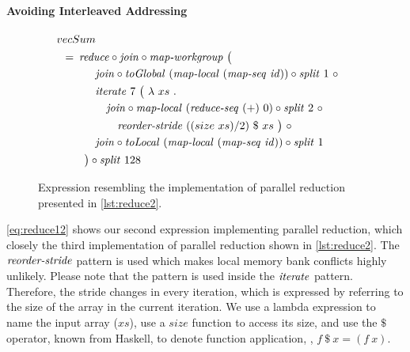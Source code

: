 \paragraph{Avoiding Interleaved Addressing}
\begin{figure}
  \begin{align*}
    &\hspace{-1.5em}vecSum\\
    &\hspace{-2em}\quad\begin{aligned}
      &=\hspace{.2em}
        \reduce \circ \join \circ \mapWorkgroup\ \big(\\
        &\qquad\quad \join \circ \toGlobal\ (\mapLocal\ (\mapSeq\ \id)) \circ \splitN\ 1\ \circ\\
        &\qquad\quad \iterateN\ 7\ \big(\ \lambda\ xs\ .\\
        &\qquad\qquad \join \circ \mapLocal\ (\reduceSeq\ (+)\ 0) \circ \splitN\ 2\ \circ\\
        &\qquad\qquad\quad \reorderStride\ ((size\ xs)/2)\ \$\ xs\ \big)\ \circ\\
        &\qquad\quad \join \circ \toLocal\ (\mapLocal\ (\mapSeq\ \id)) \circ \splitN\ 1\\
        &\qquad\big) \circ \splitN\ 128
    \end{aligned}
  \end{align*}
  \caption{Expression resembling the implementation of parallel reduction presented in \autoref{lst:reduce2}.}
  \label{eq:reduce12}
\end{figure}
%
\autoref{eq:reduce12} shows our second expression implementing parallel reduction, which closely  the third implementation of parallel reduction shown in \autoref{lst:reduce2}.
The $\text{\textit{reorder-stride}}$ pattern is used which makes local memory bank conflicts highly unlikely.
Please note that the pattern is used inside the $\text{\textit{iterate}}$ pattern.
Therefore, the stride changes in every iteration, which is expressed by referring to the size of the array in the current iteration.
We use a lambda expression to name the input array ($xs$), use a $size$ function to access its size, and use the $\$$ operator, known from Haskell, to denote function application, \ie, $f\ \$\ x = (f\ x)$.


